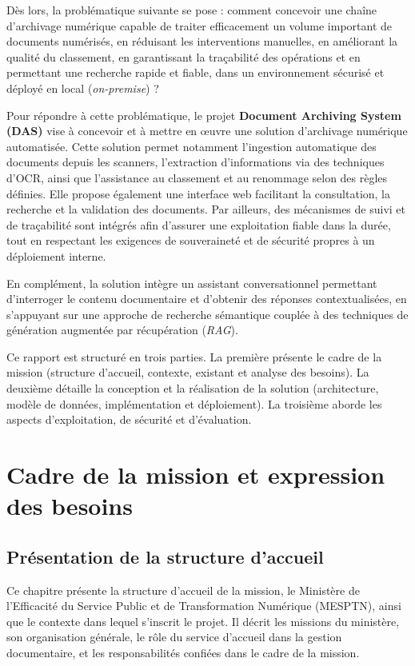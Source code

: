 \documentclass[12pt,a4paper]{report}
\newcommand{\nomMinistere}{Ministère de l'Efficacité du Service Public et de Transformation Numérique (MESPTN)}
\begin{document}
Dès lors, la problématique suivante se pose : comment concevoir une chaîne d’archivage numérique capable de traiter efficacement un volume important de documents numérisés, en réduisant les interventions manuelles, en améliorant la qualité du classement, en garantissant la traçabilité des opérations et en permettant une recherche rapide et fiable, dans un environnement sécurisé et déployé en local (\textit{on-premise}) ?

Pour répondre à cette problématique, le projet \textbf{Document Archiving System (DAS)} vise à concevoir et à mettre en œuvre une solution d’archivage numérique automatisée. Cette solution permet notamment l’ingestion automatique des documents depuis les scanners, l’extraction d’informations via des techniques d’OCR, ainsi que l’assistance au classement et au renommage selon des règles définies. Elle propose également une interface web facilitant la consultation, la recherche et la validation des documents. Par ailleurs, des mécanismes de suivi et de traçabilité sont intégrés afin d’assurer une exploitation fiable dans la durée, tout en respectant les exigences de souveraineté et de sécurité propres à un déploiement interne.

En complément, la solution intègre un assistant conversationnel permettant d’interroger le contenu documentaire et d’obtenir des réponses contextualisées, en s’appuyant sur une approche de recherche sémantique couplée à des techniques de génération augmentée par récupération (\textit{RAG}).

Ce rapport est structuré en trois parties. La première présente le cadre de la mission (structure d’accueil, contexte, existant et analyse des besoins). La deuxième détaille la conception et la réalisation de la solution (architecture, modèle de données, implémentation et déploiement). La troisième aborde les aspects d’exploitation, de sécurité et d’évaluation.

\part{Cadre de la mission et expression des besoins}
\chapter{Présentation de la structure d’accueil}
Ce chapitre présente la structure d’accueil de la mission, le \nomMinistere{}, ainsi que le contexte dans lequel s’inscrit le projet. Il décrit les missions du ministère, son organisation générale, le rôle du service d’accueil dans la gestion documentaire, et les responsabilités confiées dans le cadre de la mission.
\end{document}

